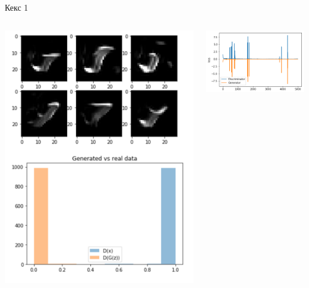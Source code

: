 \documentclass[notes,12pt, aspectratio=169]{beamer}
\begin{document}
\begin{frame}{Кекс 1}
\begin{center}
	\begin{columns}[T] %
		\begin{column}{.48\textwidth}
		\centering	\includegraphics[width=.7\linewidth]{bad2.png}
		\end{column}%
		\begin{column}{.48\textwidth}
		\centering	\includegraphics[width=.9\linewidth]{bad1.png}
		\end{column}%
	\end{columns}
\end{center}
\end{frame}
\end{document}
